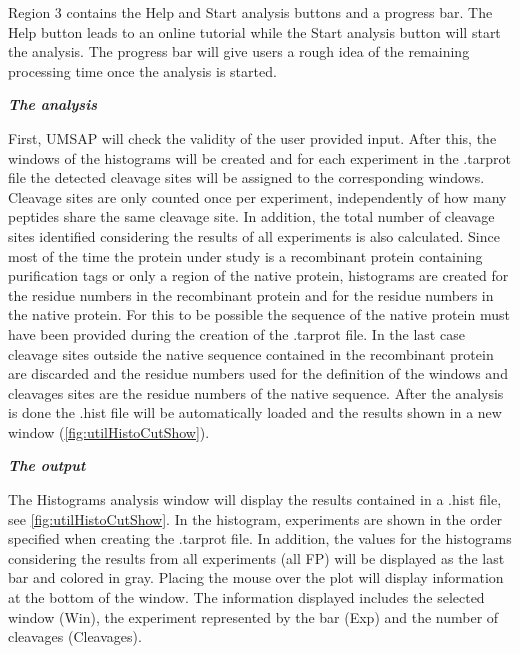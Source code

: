 Region \num{3} contains the Help and Start analysis buttons and a progress bar. The Help button leads to an online tutorial while the Start analysis button will start the analysis. The progress bar will give users a rough idea of the remaining processing time once the analysis is started.

\textit{\textbf{The analysis}}

First, UMSAP will check the validity of the user provided input. After this, the windows of the histograms will be created and for each experiment in the .tarprot file the detected cleavage sites will be assigned to the corresponding windows. Cleavage sites are only counted once per experiment, independently of how many peptides share the same cleavage site. In addition, the total number of cleavage sites identified considering the results of all experiments is also calculated. Since most of the time the protein under study is a recombinant protein containing purification tags or only a region of the native protein, histograms are created for the residue numbers in the recombinant protein and for the residue numbers in the native protein. For this to be possible the sequence of the native protein must have been provided during the creation of the .tarprot file. In the last case cleavage sites outside the native sequence contained in the recombinant protein are discarded and the residue numbers used for the definition of the windows and cleavages sites are the residue numbers of the native sequence. After the analysis is done the .hist file will be automatically loaded and the results shown in a new window (\autoref{fig:utilHistoCutShow}).

\textit{\textbf{The output}}

The Histograms analysis window will display the results contained in a .hist file, see \autoref{fig:utilHistoCutShow}. In the histogram, experiments are shown in the order specified when creating the .tarprot file. In addition, the values for the histograms considering the results from all experiments (all FP) will be displayed as the last bar and colored in gray. Placing the mouse over the plot will display information at the bottom of the window. The information displayed includes the selected window (Win), the experiment represented by the bar (Exp) and the number of cleavages (Cleavages).

